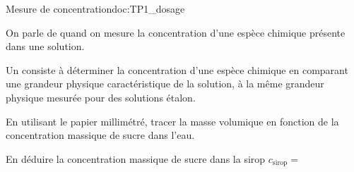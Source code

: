 \begin{doc}{Mesure de concentration}{doc:TP1_dosage}
  \begin{importants}
    On parle de  quand on mesure la concentration d'une espèce chimique présente dans une solution.
  \end{importants}
  \begin{importants}
    Un  consiste à déterminer la concentration d’une espèce chimique en comparant une grandeur physique caractéristique de la solution, à la même grandeur physique mesurée pour des solutions étalon.
  \end{importants}
\end{doc}
 
\numeroQuestion 
En utilisant le papier millimétré, tracer la masse volumique en fonction de la concentration massique de sucre dans l'eau.

\numeroQuestion
En déduire la concentration massique de sucre dans la sirop $c_\text{sirop} =$ 


